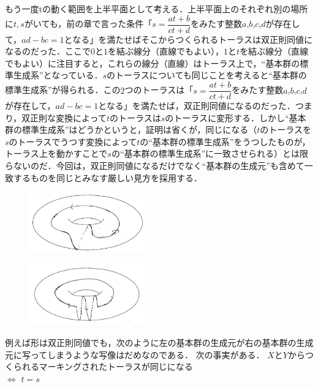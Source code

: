 もう一度tの動く範囲を上半平面として考える．上半平面上のそれぞれ別の場所に$t,s$がいても，前の章で言った条件「$s=\dfrac {at+b} {ct+d}$をみたす整数$a$,$b$,$c$,$d$が存在して，$ad-bc=1$となる」を満たせばそこからつくられるトーラスは双正則同値になるのだった．ここで$0$と$1$を結ぶ線分（直線でもよい），$1$と$t$を結ぶ線分（直線でもよい）に注目すると，これらの線分（直線）はトーラス上で，``基本群の標準生成系''となっている．$s$のトーラスについても同じことを考えると``基本群の標準生成系''が得られる．この$2$つのトーラスは「$s=\dfrac {at+b} {ct+d}$をみたす整数$a$,$b$,$c$,$d$が存在して，$ad-bc=1$となる」を満たせば，双正則同値になるのだった．つまり，双正則な変換によって$t$のトーラスは$s$のトーラスに変形する．しかし``基本群の標準生成系''はどうかというと，証明は省くが，同じになる（$t$のトーラスを$s$のトーラスでうつす変換によって$t$の``基本群の標準生成系''をうつしたものが，トーラス上を動かすことで$s$の``基本群の標準生成系''に一致させられる）とは限らないのだ．今回は，双正則同値になるだけでなく``基本群の生成元''も含めて一致するものを同じとみなす厳しい見方を採用する．\\
\begin{figure}[h]
\begin{minipage}{0.5\hsize}
\includegraphics[width=5cm]{asaka12.png}\\
\end{minipage}
\begin{minipage}{0.5\hsize}
\includegraphics[width=5cm]{asaka14.png}\\
\end{minipage}
\end{figure}
例えば形は双正則同値でも，次のように左の基本群の生成元が右の基本群の生成元に写ってしまうような写像はだめなのである．
\newpage
次の事実がある．
\thm
$X$と$Y$からつくられるマーキングされたトーラスが同じになる\\
$\Leftrightarrow $ $t=s$
\thmx
